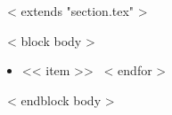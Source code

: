 ~< extends "section.tex" >~

~< block body >~
\begin{itemize}
  \setlength{\itemsep}{0pt}
  \setlength{\parskip}{0pt}
  ~< for item in items >~
  \item << item >>
  ~< endfor >~
\end{itemize}
~< endblock body >~
